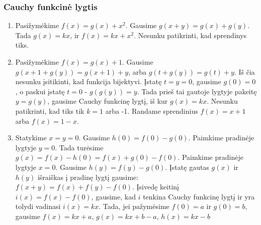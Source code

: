 \subsubsection*{Cauchy funkcinė lygtis}
\begin{enumerate}
\item
    Pasižymėkime $f(x)=g(x)+x^2$. Gausime $g(x+y)=g(x)+g(y)$. Tada
    $g(x)=kx$, ir $f(x)=kx+x^2$. Nesunku patikrinti, kad sprendinys tiks.
\item
    Pasižymėkime $f(x)=g(x)+1$. Gausime $g(x+1+g(y))=g(x+1)+y$, arba
    $g(t+g(y))=g(t)+y$. Iš čia nesunku įsitikinti, kad funkcija bijektyvi.
    Įstatę $t=y=0$, gausime $g(0)=0$, o paskui įstatę $t=0$ - $g(g(y))=y$.
    Tada prieš tai gautoje lygtyje pakeitę $y=g(y)$, gausime Cauchy
    funkcinę lygtį, iš kur $g(x)=kx$. Nesunku patikrinti, kad tiks tik
    $k=1$ arba -1. Randame sprendinius $f(x)=x+1$ arba $f(x)=1-x$.
\item
    Statykime $x=y=0$. Gausime $h(0)=f(0)-g(0)$. Paimkime pradinėje
    lygtyje $y=0$. Tada turėsime $g(x)=f(x)-h(0)=f(x)+g(0)-f(0)$. Paimkime
    pradinėje lygtyje $x=0$. Gausime $h(y)=f(y)-g(0)$. Įstatę gautas
    $g(x)$ ir $h(y)$ išraiškas į pradinę lygtį gausime:
    $f(x+y)=f(x)+f(y)-f(0)$. Įsivedę keitinį $i(x)=f(x)-f(0)$, gausime,
    kad $i$ tenkina Cauchy funkcinę lygtį ir yra tolydi vadinasi
    $i(x)=kx$. Tada, jei pažymėsime $f(0)=a$ ir $g(0)=b$, gausime
    $f(x)=kx+a$, $g(x)=kx+b-a$, $h(x)=kx-b$
    

\end{enumerate}
